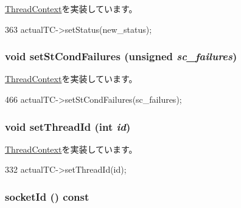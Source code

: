 \hyperlink{classThreadContext_ab09e388dd57fd5b8e05da30473b0a859}{ThreadContext}を実装しています。


\begin{DoxyCode}
363 { actualTC->setStatus(new_status); }
\end{DoxyCode}
\hypertarget{classProxyThreadContext_abbe779fa43c72cd485ddb736ab17ff61}{
\subsubsection[{setStCondFailures}]{\setlength{\rightskip}{0pt plus 5cm}void setStCondFailures (unsigned {\em sc\_\-failures})}}
\label{classProxyThreadContext_abbe779fa43c72cd485ddb736ab17ff61}


\hyperlink{classThreadContext_aaa3506321089a0ec9c36d9ceff17c346}{ThreadContext}を実装しています。


\begin{DoxyCode}
466     { actualTC->setStCondFailures(sc_failures); }
\end{DoxyCode}
\hypertarget{classProxyThreadContext_a9186b553811fbde99263b3fd831f1b0c}{
\subsubsection[{setThreadId}]{\setlength{\rightskip}{0pt plus 5cm}void setThreadId (int {\em id})}}
\label{classProxyThreadContext_a9186b553811fbde99263b3fd831f1b0c}


\hyperlink{classThreadContext_a8ab94437bf0aaa86face2bc4b2dfa138}{ThreadContext}を実装しています。


\begin{DoxyCode}
332 { actualTC->setThreadId(id); }
\end{DoxyCode}
\hypertarget{classProxyThreadContext_a1ff97b43199001357718671a4d922d12}{
\subsubsection[{socketId}]{ socketId () const}}
\label{classProxyThreadContext_a1ff97b43199001357718671a4d922d12}


